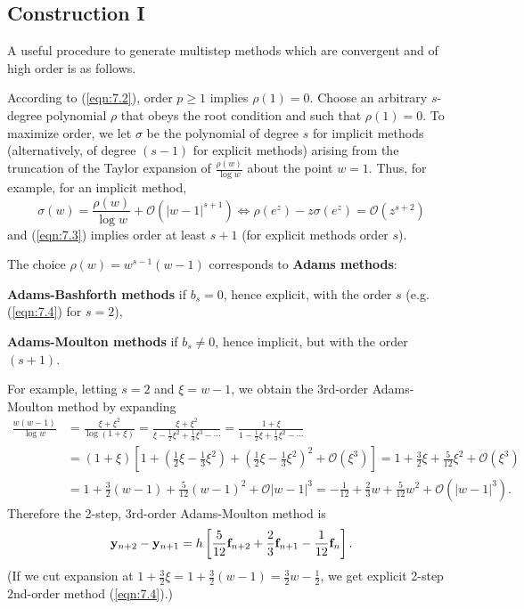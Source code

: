 \documentclass[a4paper]{article}
\begin{document}
\subsection{Construction I}
A useful procedure to generate multistep methods which are convergent and of high order is as follows.
\begin{technique}\label{tech:7.10}
    According to (\ref{eqn:7.2}), order $p \geq 1$ implies $\rho(1)=0$. Choose an arbitrary $s$-degree polynomial $\rho$ that obeys the root condition and such that $\rho(1)=0$. To maximize order, we let $\sigma$ be the polynomial of degree $s$ for implicit methods (alternatively, of degree $(s-1)$ for explicit methods) arising from the truncation of the Taylor expansion of $\frac{\rho(w)}{\log w}$ about the point $w=1$. Thus, for example, for an implicit method,
    \[
    \sigma(w)=\frac{\rho(w)}{\log w}+\mathcal{O}\left(|w-1|^{s+1}\right) \Leftrightarrow \rho\left(e^z\right)-z \sigma\left(e^z\right)=\mathcal{O}\left(z^{s+2}\right)
    \]
    and (\ref{eqn:7.3}) implies order at least $s+1$ (for explicit methods order $s$).
\end{technique}
\begin{example}\label{eg:7.11}
    The choice $\rho(w)=w^{s-1}(w-1)$ corresponds to \textbf{Adams methods}:

    \textbf{Adams-Bashforth methods} if $b_s=0$, hence explicit, with the order $s$ (e.g. (\ref{eqn:7.4}) for $s=2$),

    \textbf{Adams-Moulton methods} if $b_s \neq 0$, hence implicit, but with the order $(s+1)$.

For example, letting $s=2$ and $\xi=w-1$, we obtain the 3rd-order Adams-Moulton method by expanding
\[
\begin{aligned}
\frac{w(w-1)}{\log w} & =\frac{\xi+\xi^2}{\log (1+\xi)}=\frac{\xi+\xi^2}{\xi-\frac{1}{2} \xi^2+\frac{1}{3} \xi^3-\cdots}=\frac{1+\xi}{1-\frac{1}{2} \xi+\frac{1}{3} \xi^2-\cdots} \\
& =(1+\xi)\left[1+\left(\frac{1}{2} \xi-\frac{1}{3} \xi^2\right)+\left(\frac{1}{2} \xi-\frac{1}{3} \xi^2\right)^2+\mathcal{O}\left(\xi^3\right)\right]=1+\frac{3}{2} \xi+\frac{5}{12} \xi^2+\mathcal{O}\left(\xi^3\right) \\
& =1+\frac{3}{2}(w-1)+\frac{5}{12}(w-1)^2+\mathcal{O}|w-1|^3=-\frac{1}{12}+\frac{2}{3} w+\frac{5}{12} w^2+\mathcal{O}\left(|w-1|^3\right) .
\end{aligned}
\]
Therefore the 2-step, 3rd-order Adams-Moulton method is
\[
\mathbf{y}_{n+2}-\mathbf{y}_{n+1}=h\left[\frac{5}{12} \mathbf{f}_{n+2}+\frac{2}{3} \mathbf{f}_{n+1}-\frac{1}{12} {\bf f}_n\right] .
\]
(If we cut expansion at $1+\frac{3}{2} \xi=1+\frac{3}{2}(w-1)=\frac{3}{2} w-\frac{1}{2}$, we get explicit 2-step 2nd-order method (\ref{eqn:7.4}).)
\end{example}
\end{document}
